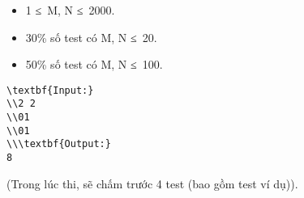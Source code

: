 \begin{itemize}
	\item     1 ≤ M, N ≤ 2000.   
	\item     30\% số test có M, N ≤ 20.   
	\item     50\% số test có M, N ≤ 100.   
\end{itemize}
\begin{itemize}
\end{itemize}
\begin{verbatim}
\textbf{Input:}
\\2 2
\\01
\\01
\\\textbf{Output:}
8\end{verbatim}

(Trong lúc thi, sẽ chấm trước 4 test (bao gồm test ví dụ)).